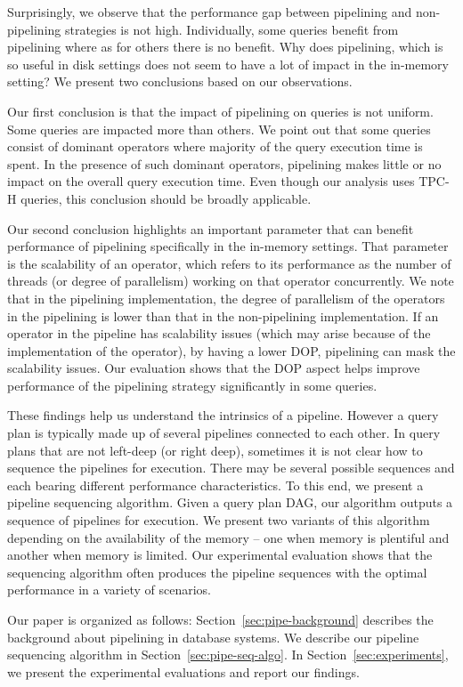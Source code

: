 Surprisingly, we observe that the performance gap between pipelining and non-pipelining strategies is not high.
Individually, some queries benefit from pipelining where as for others there is no benefit.
Why does pipelining, which is so useful in disk settings does not seem to have a lot of impact in the in-memory setting?
We present two conclusions based on our observations.

Our first conclusion is that the impact of pipelining on queries is not uniform. 
Some queries are impacted more than others. 
We point out that some queries consist of dominant operators where majority of the query execution time is spent. 
In the presence of such dominant operators, pipelining makes little or no impact on the overall query execution time. 
Even though our analysis uses TPC-H queries, this conclusion should be broadly applicable. 

Our second conclusion highlights an important parameter that can benefit performance of pipelining specifically in the in-memory settings.
That parameter is the scalability of an operator, which refers to its performance as the number of threads (or degree of parallelism) working on that operator concurrently.
We note that in the pipelining implementation, the degree of parallelism of the operators in the pipelining is lower than that in the non-pipelining implementation. 
If an operator in the pipeline has scalability issues (which may arise because of the implementation of the operator), by having a lower DOP, pipelining can mask the scalability issues.
Our evaluation shows that the DOP aspect helps improve performance of the pipelining strategy significantly in some queries.

These findings help us understand the intrinsics of a pipeline. 
However a query plan is typically made up of several pipelines connected to each other.
In query plans that are not left-deep (or right deep), sometimes it is not clear how to sequence the pipelines for execution.
There may be several possible sequences and each bearing different performance characteristics.
To this end, we present a pipeline sequencing algorithm.
Given a query plan DAG, our algorithm outputs a sequence of pipelines for execution. 
We present two variants of this algorithm depending on the availability of the memory -- one when memory is plentiful and another when memory is limited.
Our experimental evaluation shows that the sequencing algorithm often produces the pipeline sequences with the optimal performance in a variety of scenarios. 

Our paper is organized as follows: Section~\ref{sec:pipe-background} describes the background about pipelining in database systems.
We describe our pipeline sequencing algorithm in Section~\ref{sec:pipe-seq-algo}.
In Section~\ref{sec:experiments}, we present the experimental evaluations and report our findings.